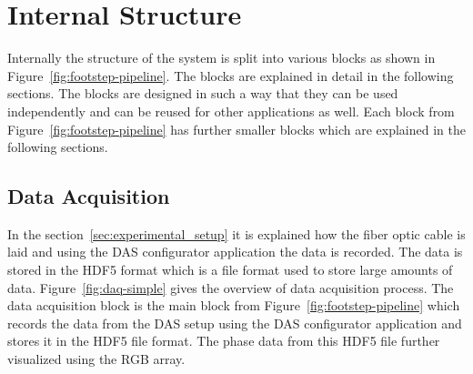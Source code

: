 \section{Internal Structure}
Internally the structure of the system is split into various blocks as shown in Figure~\ref{fig:footstep-pipeline}. The blocks are explained in detail in the following sections. The blocks are designed in such a way that they can be used independently and can be reused for other applications as well. Each block from Figure~\ref{fig:footstep-pipeline} has further smaller blocks which are explained in the following sections. 

\subsection{Data Acquisition}\label{sec:data_acquisition}
In the section~\ref{sec:experimental_setup} it is explained how the fiber optic cable is laid and using the DAS configurator application the data is recorded. The data is stored in the HDF5 format which is a file format used to store large amounts of data. Figure~\ref{fig:daq-simple} gives the overview of data acquisition process. The data acquisition block is the main block from Figure~\ref{fig:footstep-pipeline} which records the data from the DAS setup using the DAS configurator application and stores it in the HDF5 file format. The phase data from this HDF5 file further visualized using the RGB array.


